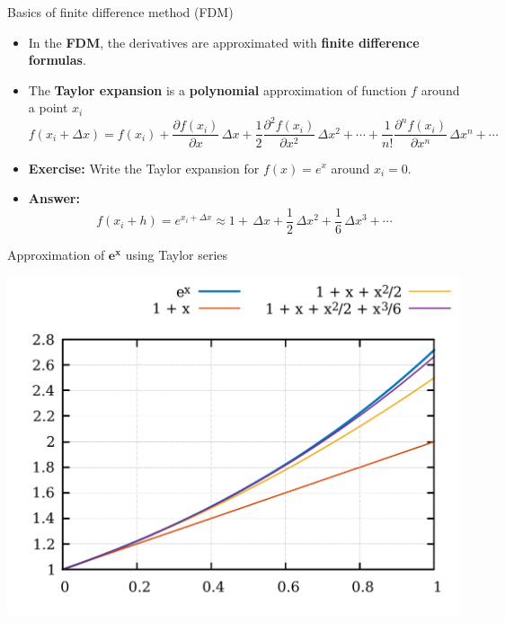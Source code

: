 \begin{frame}{Basics of finite difference method (FDM)}
\begin{itemize}
\item In the \alert{\bf FDM}, the derivatives are approximated
with {\bf finite difference formulas}.
\pause
\item The \alert{\bf Taylor expansion} is a \textbf{polynomial} approximation of function $f$ around
a point $x_{i}$
\[
f(x_{i}+\Delta x)=f(x_{i})+\frac{\partial f(x_{i})}{\partial x}\,\Delta x+\frac{1}{2}\frac{\partial^{2}f(x_{i})}{\partial x^{2}}\,\Delta x^{2}+\cdots+\frac{1}{n!}\frac{\partial^{n}f(x_{i})}{\partial x^{n}}\,\Delta x^{n}+\cdots
\]
\pause
\item \alert{\textbf{Exercise:}} Write the Taylor expansion for $f(x)=e^{x}$ around
$x_{i}=0$. 
\hiddenpause
\item \textbf{Answer:}
\[
f(x_{i}+h)=e^{x_{i}+\Delta x} \approx 1+\, \Delta x+\frac{1}{2}\, \Delta x^{2}+\frac{1}{6}\, \Delta x^{3}+\cdots
\]
\end{itemize}
\end{frame}
%
%
\begin{frame}{Approximation of $\boldsymbol{e^{\boldsymbol{x}}}$ using Taylor series}
\begin{center}
\includegraphics[height=0.9\textheight]{figures/reactive-transport/taylor-expansion-exp}
\par\end{center}

\end{frame}
